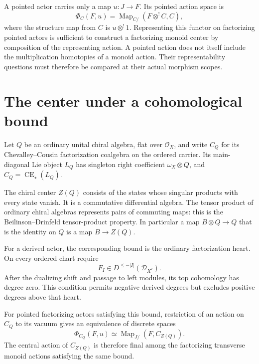 A pointed actor carries only a map $u:J\to F$. Its pointed
action space is
\[
 \Phi_C(F,u)=\operatorname{Map}_{C/}(F\otimes^!C,C),
\]
where the structure map from $C$ is $u\otimes^!1$.
Representing this functor on factorizing pointed actors is
sufficient to construct a factorizing monoid center by
composition of the representing action. A pointed action
does not itself include the multiplication homotopies of
a monoid action. Their representability questions must
therefore be compared at their actual morphism scopes.

\section{The center under a cohomological bound}

Let $Q$ be an ordinary unital chiral algebra, flat over
$\mathcal O_X$, and write $C_Q$ for its
Chevalley--Cousin factorization coalgebra on the ordered
carrier. Its main-diagonal Lie object $L_Q$ has singleton
right coefficient $\omega_X\otimes Q$, and
$C_Q=\operatorname{CE}_\star(L_Q)$.

The chiral center $Z(Q)$ consists of the states whose
singular products with every state vanish. It is a
commutative differential algebra. The tensor product of
ordinary chiral algebras represents pairs of commuting
maps: this is the Beilinson--Drinfeld tensor-product
property. In particular a map $B\otimes Q\to Q$ that is
the identity on $Q$ is a map $B\to Z(Q)$.

For a derived actor, the corresponding bound is the
ordinary factorization heart. On every ordered chart
require
\[
 F_I\in D^{\leq-|I|}(\mathcal D_{X^I}).
\]
After the dualizing shift and passage to left modules,
its top cohomology has degree zero. This condition permits
negative derived degrees but excludes positive degrees
above that heart.

\begin{theorem}\label{mht:thm:bounded-geometric-centre}
For pointed factorizing actors satisfying this bound,
restriction of an action on $C_Q$ to its vacuum gives an
equivalence of discrete spaces
\[
 \Phi_{C_Q}(F,u)
     \simeq\operatorname{Map}_{J/}(F,C_{Z(Q)}).
\]
The central action of $C_{Z(Q)}$ is therefore final among
the factorizing transverse monoid actions satisfying
the same bound.
\end{theorem}

